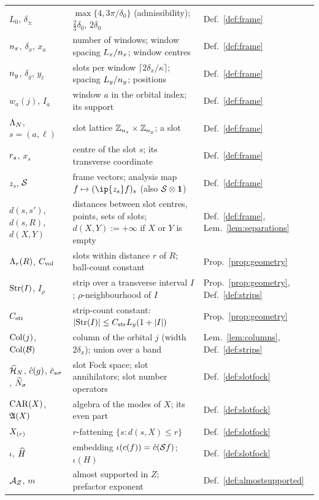 \begin{longtable}{@{}>{\raggedright\arraybackslash}p{}>{\raggedright\arraybackslash}p{}>{\raggedright\arraybackslash}p{}@{}}
$L_0$, $\delta_\pm$ & $\max\{4,3\pi/\delta_0\}$ (admissibility); $\frac23\delta_0$, $2\delta_0$ & Def.~\ref{def:frame}\\
$n_x$, $\delta_x$, $x_a$ & number of windows; window spacing $L_x/n_x$; window centres & Def.~\ref{def:frame}\\
$n_y$, $\delta_y$, $y_\ell$ & slots per window $\lceil2\delta_x/\kappa\rceil$; spacing $L_y/n_y$; positions & Def.~\ref{def:frame}\\
$w_a(j)$, $I_a$ & window $a$ in the orbital index; its support & Def.~\ref{def:frame}\\
$\Lambda_N$, $s=(a,\ell)$ & slot lattice $\mathbb{Z}_{n_x}\times\mathbb{Z}_{n_y}$; a slot & Def.~\ref{def:frame}\\
$r_{s}$, $x_s$ & centre of the slot $s$; its transverse coordinate & Def.~\ref{def:frame}\\
$z_s$, $\mathcal{S}$ & frame vectors; analysis map $f\mapsto(\ip{z_s}f)_s$ (also $\mathcal{S}\otimes\mathbf{1}$) & Def.~\ref{def:frame}\\
$d(s,s')$, $d(s,R)$, $d(X,Y)$ & distances between slot centres, points, sets of slots; $d(X,Y):=+\infty$ if $X$ or $Y$ is empty & Def.~\ref{def:frame}, Lem.~\ref{lem:separations}\\
$\Lambda_{r}(R)$, $C_{\mathrm{vol}}$ & slots within distance $r$ of $R$; ball-count constant & Prop.~\ref{prop:geometry}\\
$\mathrm{Str}(I)$, $I_\rho$ & strip over a transverse interval $I$; $\rho$-neighbourhood of $I$ & Prop.~\ref{prop:geometry}, Def.~\ref{def:strips}\\
$C_{\rm str}$ & strip-count constant: $\lvert\mathrm{Str}(I)\rvert\le C_{\rm str}L_y(1+\lvert I\rvert)$ & Prop.~\ref{prop:geometry}\\
$\mathrm{Col}(j)$, $\mathrm{Col}(\mathcal B)$ & column of the orbital $j$ (width $2\delta_x$); union over a band & Lem.~\ref{lem:columns}, Def.~\ref{def:strips}\\
$\widehat{\mathcal{H}}_N$, $\hat{c}(g)$, $\hat{c}_{s\sigma}$, $\widehat{N}_{\sigma}$ & slot Fock space; slot annihilators; slot number operators & Def.~\ref{def:slotfock}\\
$\mathrm{CAR}(X)$, $\mathfrak{A}(X)$ & algebra of the modes of $X$; its even part & Def.~\ref{def:slotfock}\\
$X_{(r)}$ & $r$-fattening $\{s:d(s,X)\le r\}$ & Def.~\ref{def:slotfock}\\
$\iota$, $\widehat{H}$ & embedding $\iota(c(f))=\hat{c}(\mathcal{S} f)$; $\iota(H)$ & Def.~\ref{def:slotfock}\\
$\mathcal{A}_Z$, $m$ & almost supported in $Z$; prefactor exponent & Def.~\ref{def:almostsupported}\\

\end{longtable}
